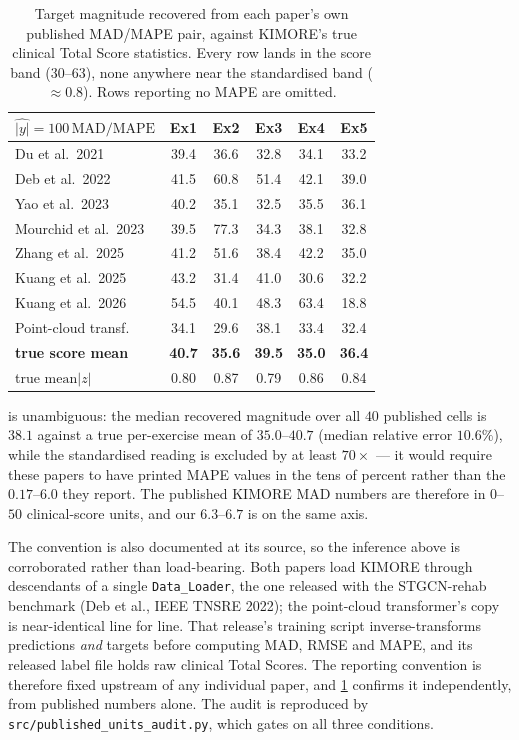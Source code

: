 \documentclass[10pt,twocolumn,letterpaper]{article}
\begin{document}
\begin{table}[t]
\centering\small
\setlength{\tabcolsep}{4pt}
\begin{tabular}{lccccc}
\toprule
$\widehat{|y|}=100\,\mathrm{MAD}/\mathrm{MAPE}$ & Ex1 & Ex2 & Ex3 & Ex4 & Ex5 \\
\midrule
Du et al.~2021           & 39.4 & 36.6 & 32.8 & 34.1 & 33.2 \\
Deb et al.~2022          & 41.5 & 60.8 & 51.4 & 42.1 & 39.0 \\
Yao et al.~2023          & 40.2 & 35.1 & 32.5 & 35.5 & 36.1 \\
Mourchid et al.~2023     & 39.5 & 77.3 & 34.3 & 38.1 & 32.8 \\
Zhang et al.~2025        & 41.2 & 51.6 & 38.4 & 42.2 & 35.0 \\
Kuang et al.~2025        & 43.2 & 31.4 & 41.0 & 30.6 & 32.2 \\
Kuang et al.~2026        & 54.5 & 40.1 & 48.3 & 63.4 & 18.8 \\
Point-cloud transf.      & 34.1 & 29.6 & 38.1 & 33.4 & 32.4 \\
\midrule
\textbf{true score mean} & \textbf{40.7} & \textbf{35.6} & \textbf{39.5} & \textbf{35.0} & \textbf{36.4} \\
true $\mathrm{mean}|z|$  & 0.80 & 0.87 & 0.79 & 0.86 & 0.84 \\
\bottomrule
\end{tabular}
\caption{Target magnitude recovered from each paper's own published MAD/MAPE pair, against KIMORE's
true clinical Total Score statistics. Every row lands in the score band ($30$--$63$), none anywhere
near the standardised band ($\approx\!0.8$). Rows reporting no MAPE are omitted.}
\label{tab:supp:units}
\end{table}

 is unambiguous: the median recovered magnitude over all $40$ published cells is
$38.1$ against a true per-exercise mean of $35.0$--$40.7$ (median relative error $10.6\%$), while the
standardised reading is excluded by at least $70\times$ --- it would require these papers to have
printed MAPE values in the tens of percent rather than the $0.17$--$6.0$ they report. The published
KIMORE MAD numbers are therefore in $0$--$50$ clinical-score units, and our $6.3$--$6.7$ is on the same
axis.

The convention is also documented at its source, so the inference above is corroborated rather than
load-bearing. Both papers load KIMORE through descendants of a single \texttt{Data\_Loader}, the one
released with the STGCN-rehab benchmark (Deb et al., IEEE TNSRE 2022); the point-cloud transformer's
copy is near-identical line for line. That release's training script inverse-transforms predictions
\emph{and} targets before computing MAD, RMSE and MAPE, and its released label file holds raw clinical
Total Scores. The reporting convention is therefore fixed upstream of any individual paper, and
\cref{tab:supp:units} confirms it independently, from published numbers alone.
The audit is reproduced by \texttt{src/published\_units\_audit.py}, which gates on all three
conditions.
\end{document}
